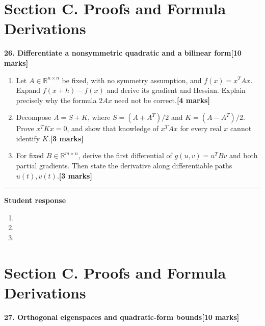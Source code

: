 \documentclass[11pt,a4paper]{article}
\newlength{\BlankAnswerHeight}\setlength{\BlankAnswerHeight}{16mm}
\newcommand{\AnswerBlank}{\leavevmode\par\vspace{\BlankAnswerHeight}}
\begin{document}
\newpage\section*{Section C. Proofs and Formula Derivations}
\textbf{26. Differentiate a nonsymmetric quadratic and a bilinear form}\hfill\textbf{[10 marks]}\par\medskip
\begin{enumerate}[label=(\alph*),leftmargin=8mm,itemsep=3pt]
\item Let \(A\in\mathbb R^{n\times n}\) be fixed, with no symmetry assumption, and \(f(x)=x^TAx\). Expand \(f(x+h)-f(x)\) and derive its gradient and Hessian. Explain precisely why the formula \(2Ax\) need not be correct.\hfill\textbf{[4 marks]}
\item Decompose \(A=S+K\), where \(S=(A+A^T)/2\) and \(K=(A-A^T)/2\). Prove \(x^TKx=0\), and show that knowledge of \(x^TAx\) for every real \(x\) cannot identify \(K\).\hfill\textbf{[3 marks]}
\item For fixed \(B\in\mathbb R^{m\times n}\), derive the first differential of \(g(u,v)=u^TBv\) and both partial gradients. Then state the derivative along differentiable paths \(u(t),v(t)\).\hfill\textbf{[3 marks]}
\end{enumerate}\par\medskip\hrule\medskip\textbf{Student response}\par
\begin{enumerate}[label=(\alph*),leftmargin=8mm,itemsep=3pt]
\item
\AnswerBlank
\item
\AnswerBlank
\item
\AnswerBlank
\end{enumerate}
\newpage\section*{Section C. Proofs and Formula Derivations}
\textbf{27. Orthogonal eigenspaces and quadratic-form bounds}\hfill\textbf{[10 marks]}\par\medskip
\end{document}
